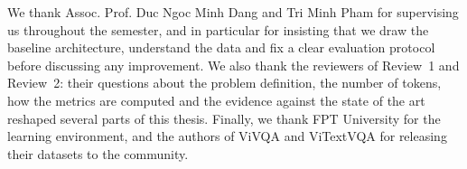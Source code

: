 
\begin{acknowledgements}

We thank Assoc. Prof. Duc Ngoc Minh Dang and Tri Minh Pham for supervising us
throughout the semester, and in particular for insisting that we draw the
baseline architecture, understand the data and fix a clear evaluation protocol
before discussing any improvement. We also thank the reviewers of Review~1 and
Review~2: their questions about the problem definition, the number of tokens,
how the metrics are computed and the evidence against the state of the art
reshaped several parts of this thesis. Finally, we thank FPT University for the
learning environment, and the authors of ViVQA and ViTextVQA for releasing their
datasets to the community.

\end{acknowledgements}
